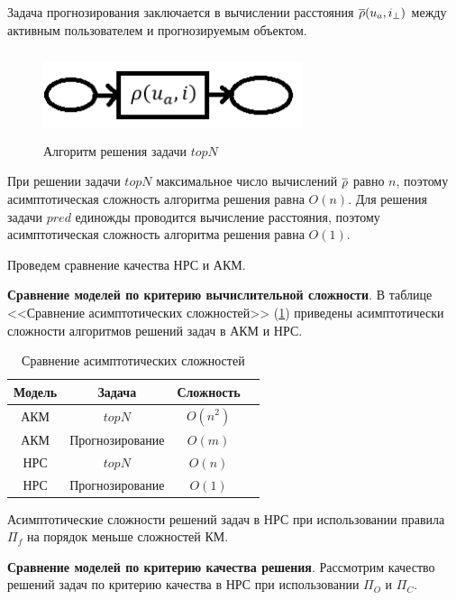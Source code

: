 Задача прогнозирования заключается в вычислении расстояния $\overline{\rho}(u_a, i_{\bot})$ между
активным пользователем и прогнозируемым объектом.
\begin{figure}[H]
	\caption{Алгоритм решения задачи $topN$}
	\begin{center}
		\includegraphics[width=3in,height=1in]{pics/prdn-fuz.png}
	\end{center}
\end{figure}

При решении задачи $topN$ максимальное число вычислений $\overline{\rho}$ равно $n$,
поэтому асимптотическая сложность алгоритма решения равна $O(n)$. Для решения
задачи $pred$ единожды проводится вычисление расстояния,
поэтому асимптотическая сложность алгоритма решения равна $O(1)$.

Проведем сравнение качества НРС и АКМ.

{\bf Сравнение моделей по критерию вычислительной сложности}.
В таблице <<Сравнение асимптотических сложностей>> (\ref{tbl:complex})
приведены асимптотически сложности алгоритмов решений задач в АКМ и НРС.

\begin{table}[h]
	\caption{Сравнение асимптотических сложностей}
	\label{tbl:complex}
  \begin{center}
  \begin{tabular}{|c|c|c|c|}
	\hline
	Модель & Задача & Сложность  \\ \hline
	АКМ & $topN$ & $O(n^2)$  \\ \hline
	АКМ & Прогнозирование & $O(m)$ \\ \hline
	НРС & $topN$ & $O(n)$ \\ \hline
	НРС & Прогнозирование & $O(1)$ \\ \hline
  \end{tabular}
\end{center}
\end{table}
Асимптотические сложности решений задач в НРС
при использовании правила $\Pi_f$ на порядок меньше сложностей
КМ.

{\bf Сравнение моделей по критерию качества решения}.
Рассмотрим качество решений задач по критерию качества
в НРС при использовании $\Pi_O$ и $\Pi_C$.

